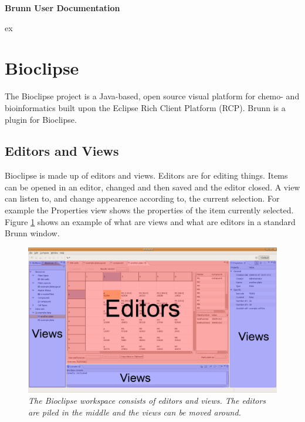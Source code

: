 \documentclass[a4paper,10pt]{article}
\begin{document}
    \huge 
    \noindent
    \begin{center}
        \textbf{Brunn User Documentation}
    \end{center}

     ex
    \normalsize
    \tableofcontents
    \newpage
    \section{Bioclipse}
        The Bioclipse project is a Java-based, open source visual platform for
        chemo- and bioinformatics built upon the Eclipse Rich Client Platform
        (RCP). Brunn is a plugin for Bioclipse.

        \subsection{Editors and Views}
            Bioclipse is made up of editors and views. Editors are for editing
            things. Items can be opened in an editor, changed and then saved and
            the editor closed. A view can listen to, and change appearence
            according to, the current selection. For example the Properties view
            shows the properties of the item currently selected. Figure
            \ref{editorsAndViews} shows an example of what are views and what
            are editors in a standard Brunn window.
            
            \begin{figure}[htbp]
                \begin{center}
                    \includegraphics[width=1\textwidth]{images/EditorsViews.png}
                \end{center}
                \caption{\textit{The Bioclipse workspace consists of editors
                                 and views. The editors are piled in the
                                 middle and the views can be moved around.}}
                \label{editorsAndViews}
            \end{figure}
\end{document}
